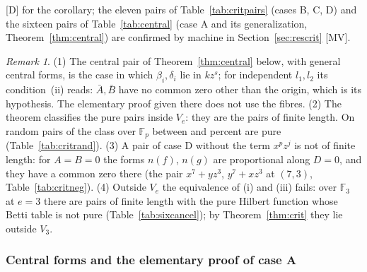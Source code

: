 \documentclass[11pt]{article}
\theoremstyle{definition}
\theoremstyle{remark}
\newtheorem{remark}{Remark}
\newcommand{\F}{\mathbb{F}}
\begin{document}
[D] for the corollary; the eleven pairs of Table~\ref{tab:critpairs} (cases B, C, D) and the sixteen pairs of Table~\ref{tab:central} (case A and its generalization, Theorem~\ref{thm:central}) are confirmed by machine in Section~\ref{sec:rescrit} [MV].

\begin{remark}\label{rem:critrem}
(1) The central pair of Theorem~\ref{thm:central} below, with general central forms, is the case in which $\beta_i,\delta_i$ lie in $kz^s$; for independent $l_1,l_2$ its condition~(ii) reads: $\bar A,\bar B$ have no common zero other than the origin, which is its hypothesis. The elementary proof given there does not use the fibres. (2) The theorem classifies the pure pairs inside $V_e$: they are the pairs of finite length. On random pairs of the class over $\F_p$ between \ncritShareMin{} and \ncritShareMax{} percent are pure (Table~\ref{tab:critrand}). (3) A pair of case D without the term $x^pz^j$ is not of finite length: for $A=B=0$ the forms $n(f)$, $n(g)$ are proportional along $D=0$, and they have a common zero there (the pair $x^7+yz^3$, $y^7+xz^3$ at $(7,3)$, Table~\ref{tab:critneg}). (4) Outside $V_e$ the equivalence of (i) and (iii) fails: over $\F_3$ at $e=3$ there are pairs of finite length with the pure Hilbert function whose Betti table is not pure (Table~\ref{tab:sixcancel}); by Theorem~\ref{thm:crit} they lie outside $V_3$.
\end{remark}

\subsubsection*{Central forms and the elementary proof of case A}
\end{document}
